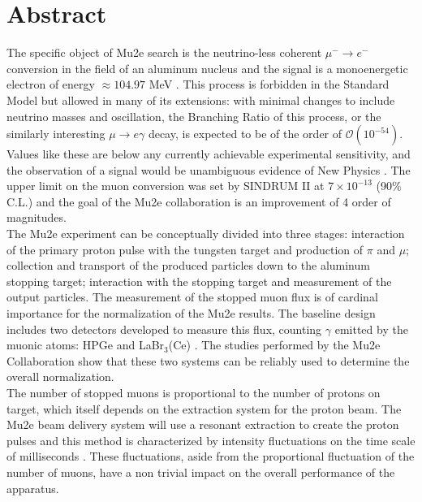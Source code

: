 \documentclass[12pt,a4paper,openright, oneside, titlepage]{book} %
\begin{document}
\chapter*{\centering Abstract}
\begin{changemargin}{1cm}{1cm}
The specific object of Mu2e search is  the neutrino-less coherent $\mu^-\rightarrow e^-$ conversion in the field of an aluminum nucleus and the signal is a monoenergetic electron of energy $ \approx 104.97$ MeV \cite{MTDR}.
This process is forbidden in the Standard Model but allowed in many of its extensions: with minimal changes to include neutrino masses and oscillation, the Branching Ratio of this process, or the similarly interesting $\mu\rightarrow e \gamma$ decay, is expected to be of the order of $\mathcal{O}(10^{-54})$.
Values like these are below any currently achievable experimental sensitivity, and the observation of a signal would be unambiguous evidence of New Physics \cite{Signorelli}.
The upper limit on the muon conversion was set by SINDRUM II at $7\times10^{-13}$ (90\% C.L.) \cite{SINDRUMII} and the goal of the Mu2e collaboration is an improvement of 4 order of magnitudes.\\
The Mu2e experiment can be conceptually divided into three stages: interaction of the primary proton pulse with the tungsten target and production of $\pi$ and $\mu$; collection and transport of the produced particles down to the aluminum stopping target; interaction with the stopping target and measurement of the output particles.
The measurement of the stopped muon flux is of cardinal importance for the normalization of the Mu2e results.
The baseline design includes two detectors developed to measure this flux, counting $\gamma$ emitted by the muonic atoms: HPGe and LaBr$_3$(Ce) \cite{STM:2016}\cite{LaBr3:2020}.
The studies performed by the Mu2e Collaboration show that these two systems can be reliably used to determine the overall normalization.\\
The number of stopped muons is proportional to the number of protons on target, which itself depends on the extraction system for the proton beam. 
The Mu2e beam delivery system will use a resonant extraction to create the proton pulses and this method is characterized by intensity fluctuations on the time scale of milliseconds \cite{SpillSim}. 
These fluctuations, aside from the proportional fluctuation of the number of muons, have a non trivial impact on the overall performance of the apparatus. 

\end{changemargin}
\end{document}
